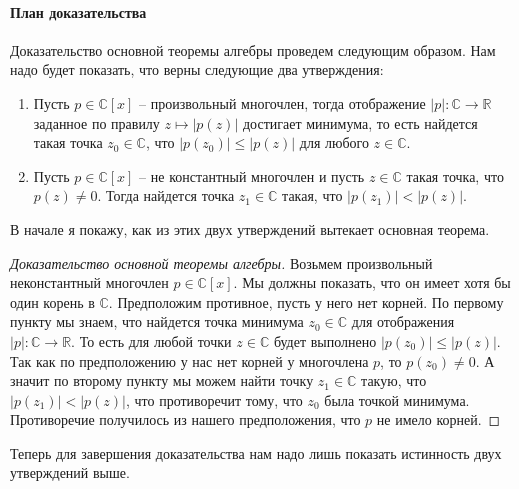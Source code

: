 \paragraph{План доказательства}

Доказательство основной теоремы алгебры проведем следующим образом.
Нам надо будет показать, что верны следующие два утверждения:
\begin{enumerate}
\item Пусть $p\in \mathbb C[x]$ -- произвольный многочлен, тогда отображение $|p|\colon \mathbb C\to \mathbb R$ заданное по правилу $z\mapsto |p(z)|$ достигает минимума, то есть найдется такая точка $z_0\in\mathbb C$, что $|p(z_0)|\leqslant |p(z)|$ для любого $z\in \mathbb C$.

\item Пусть $p\in \mathbb C[x]$ -- не константный многочлен и пусть $z\in \mathbb C$ такая точка, что $p(z) \neq 0$.
Тогда найдется точка $z_1\in \mathbb C$ такая, что $|p(z_1)| < |p(z)|$.
\end{enumerate}

В начале я покажу, как из этих двух утверждений вытекает основная теорема.

\begin{proof}
[Доказательство основной теоремы алгебры]
Возьмем произвольный неконстантный многочлен $p\in\mathbb C[x]$.
Мы должны показать, что он имеет хотя бы один корень в $\mathbb C$.
Предположим противное, пусть у него нет корней.
По первому пункту мы знаем, что найдется точка минимума $z_0\in\mathbb C$ для отображения $|p|\colon \mathbb C\to \mathbb R$.
То есть для любой точки $z\in\mathbb C$ будет выполнено $|p(z_0)|\leqslant |p(z)|$.
Так как по предположению у нас нет корней у многочлена $p$, то $p(z_0) \neq 0$.
А значит по второму пункту мы можем найти точку $z_1\in\mathbb C$ такую, что $|p(z_1)|< |p(z)|$, что противоречит тому, что $z_0$ была точкой минимума.
Противоречие получилось из нашего предположения, что $p$ не имело корней.
\end{proof}

Теперь для завершения доказательства нам надо лишь показать истинность двух утверждений выше.



